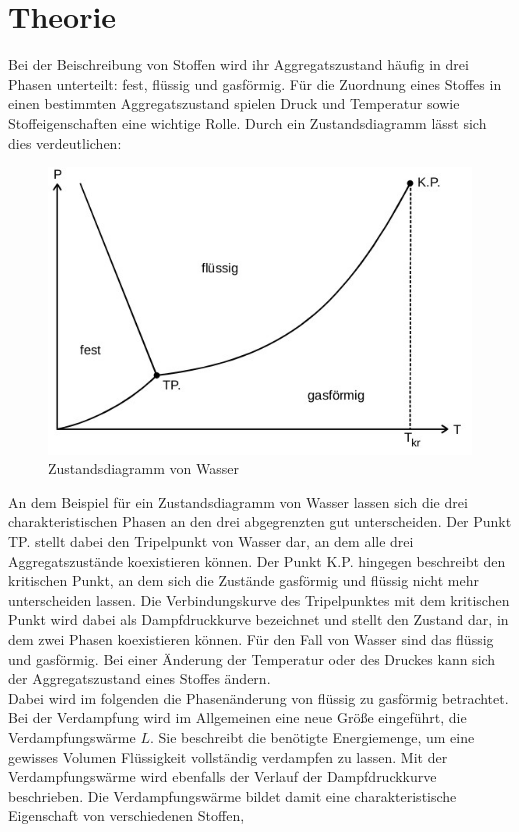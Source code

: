 \section{Theorie}\justifying
Bei der Beischreibung von Stoffen wird ihr Aggregatszustand häufig in drei 
Phasen unterteilt: fest, flüssig und gasförmig. 
Für die Zuordnung eines Stoffes in einen bestimmten Aggregatszustand spielen
Druck und Temperatur sowie Stoffeigenschaften eine wichtige Rolle.
Durch ein Zustandsdiagramm lässt sich dies verdeutlichen:
\begin{figure}
    \centering
    \includegraphics[width=0.75\linewidth]{./images/zustand.jpg}
    \caption{Zustandsdiagramm von Wasser \cite{V203}}
    \label{fig:1}
\end{figure}
An dem Beispiel für ein Zustandsdiagramm von Wasser lassen sich die drei
charakteristischen Phasen an den drei abgegrenzten gut unterscheiden.
Der Punkt TP. stellt dabei den Tripelpunkt von Wasser dar, an dem alle drei Aggregatszustände
koexistieren können. Der Punkt K.P. hingegen beschreibt den kritischen Punkt, an dem sich
die Zustände gasförmig und flüssig nicht mehr unterscheiden lassen. Die Verbindungskurve
des Tripelpunktes mit dem kritischen Punkt wird dabei als Dampfdruckkurve bezeichnet und
stellt den Zustand dar, in dem zwei Phasen koexistieren können.
Für den Fall von Wasser sind das flüssig und gasförmig.
Bei einer Änderung der Temperatur oder des Druckes kann sich der Aggregatszustand eines
Stoffes ändern. \\
Dabei wird im folgenden die Phasenänderung von flüssig zu gasförmig betrachtet.
Bei der Verdampfung wird im Allgemeinen eine neue Größe eingeführt, die Verdampfungswärme $L$.
Sie beschreibt die benötigte Energiemenge, um eine gewisses Volumen Flüssigkeit vollständig
verdampfen zu lassen. Mit der Verdampfungswärme wird ebenfalls der Verlauf der Dampfdruckkurve beschrieben.
Die Verdampfungswärme bildet damit eine charakteristische Eigenschaft von verschiedenen Stoffen,
